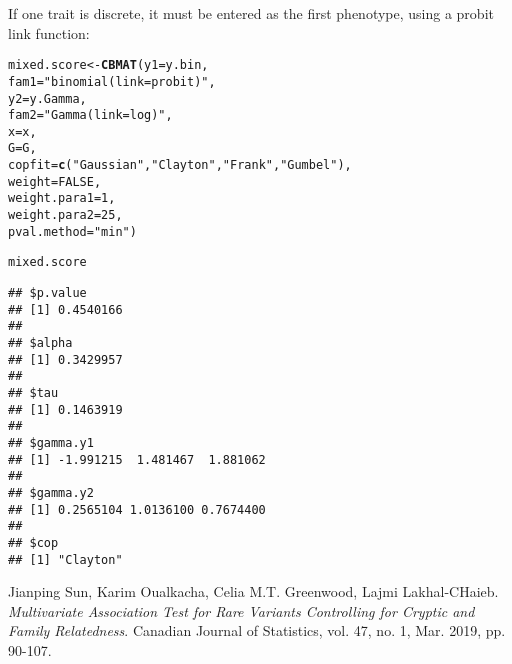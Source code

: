 \documentclass{article}\usepackage[]{graphicx}\usepackage[]{color}
\makeatletter
\newcommand{\hlnum}[1]{\textcolor[rgb]{0.686,0.059,0.569}{#1}}%
\newcommand{\hlstr}[1]{\textcolor[rgb]{0.192,0.494,0.8}{#1}}%
\newcommand{\hlstd}[1]{\textcolor[rgb]{0.345,0.345,0.345}{#1}}%
\newcommand{\hlkwb}[1]{\textcolor[rgb]{0.69,0.353,0.396}{#1}}%
\newcommand{\hlkwc}[1]{\textcolor[rgb]{0.333,0.667,0.333}{#1}}%
\newcommand{\hlkwd}[1]{\textcolor[rgb]{0.737,0.353,0.396}{\textbf{#1}}}%
\newenvironment{kframe}{%
 \def\at@end@of@kframe{}%
 \ifinner\ifhmode%
  \def\at@end@of@kframe{\end{minipage}}%
  \begin{minipage}{\columnwidth}%
 \fi\fi%
 \def\FrameCommand##1{\hskip\@totalleftmargin \hskip-\fboxsep
 \colorbox{shadecolor}{##1}\hskip-\fboxsep
     \hskip-\linewidth \hskip-\@totalleftmargin \hskip\columnwidth}%
 \MakeFramed {\advance\hsize-\width
   \@totalleftmargin\z@ \linewidth\hsize
   \@setminipage}}%
 {\par\unskip\endMakeFramed%
 \at@end@of@kframe}
\newenvironment{knitrout}{}{} %
\makeatother
\begin{document}
If one trait is discrete, it must be entered as the first phenotype, using a probit link function:
\begin{knitrout}
\color{fgcolor}\begin{kframe}
\begin{alltt}
\hlstd{mixed.score} \hlkwb{<-}\hlkwd{CBMAT}\hlstd{(}\hlkwc{y1}\hlstd{=y.bin,}
                    \hlkwc{fam1}\hlstd{=}\hlstr{"binomial(link=probit)"}\hlstd{,}
                    \hlkwc{y2}\hlstd{=y.Gamma,}
                    \hlkwc{fam2}\hlstd{=}\hlstr{"Gamma(link=log)"}\hlstd{,}
                    \hlkwc{x}\hlstd{=x,}
                    \hlkwc{G}\hlstd{=G,}
                    \hlkwc{copfit}\hlstd{=}\hlkwd{c}\hlstd{(}\hlstr{"Gaussian"}\hlstd{,}\hlstr{"Clayton"}\hlstd{,}\hlstr{"Frank"}\hlstd{,}\hlstr{"Gumbel"}\hlstd{),}
                    \hlkwc{weight}\hlstd{=}\hlnum{FALSE}\hlstd{,}
                    \hlkwc{weight.para1}\hlstd{=}\hlnum{1}\hlstd{,}
                    \hlkwc{weight.para2}\hlstd{=}\hlnum{25}\hlstd{,}
                    \hlkwc{pval.method}\hlstd{=}\hlstr{"min"}\hlstd{)}
\end{alltt}


{\ttfamily\noindent\itshape\color{messagecolor}{\#\# Starting association analysis...}}\begin{alltt}
\hlstd{mixed.score}
\end{alltt}
\begin{verbatim}
## $p.value
## [1] 0.4540166
## 
## $alpha
## [1] 0.3429957
## 
## $tau
## [1] 0.1463919
## 
## $gamma.y1
## [1] -1.991215  1.481467  1.881062
## 
## $gamma.y2
## [1] 0.2565104 1.0136100 0.7674400
## 
## $cop
## [1] "Clayton"
\end{verbatim}
\end{kframe}
\end{knitrout}

\begin{thebibliography}{9}
 Jianping Sun, Karim Oualkacha, Celia M.T. Greenwood, Lajmi Lakhal-CHaieb. \emph{Multivariate Association Test for Rare Variants Controlling for Cryptic and Family Relatedness}. Canadian Journal of Statistics, vol. 47, no. 1, Mar. 2019, pp. 90-107.

\end{thebibliography}
\end{document}
